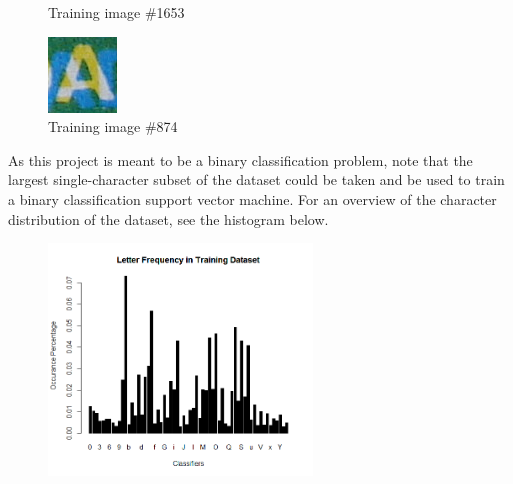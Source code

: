 \documentclass{article}
\begin{document}
\begin{figure}[!htb]
  \caption{Training image \#1653}\label{fig:awesome_image2}
\endminipage\hfill
{}%
  \includegraphics[width=\linewidth]{874/original.png}
  \caption{Training image \#874}\label{fig:awesome_image3}
\endminipage
\end{figure}

As this project is meant to be a binary classification problem, note that the largest single-character subset of the dataset could be taken and be used
to train a binary classification support vector machine. For an overview of the character distribution of the dataset, see the histogram below. 

\begin{figure}[!htb]
  \begin{center}
   \includegraphics[width=7cm]{hist.png}
  \end{center}
\end{figure}
\end{document}

